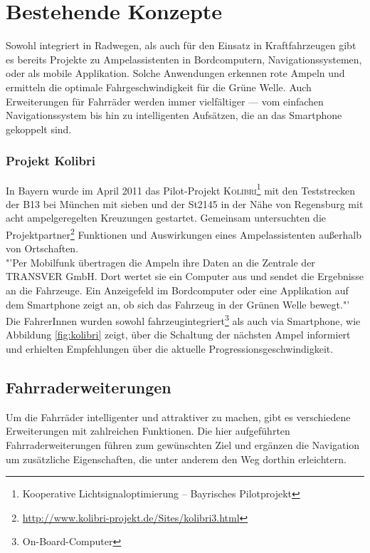 \chapter{\label{chap:state}Bestehende Konzepte}
Sowohl integriert in Radwegen, als auch für den Einsatz in Kraftfahrzeugen gibt es bereits Projekte zu Ampelassistenten in Bordcomputern, Navigationssystemen, oder als mobile Applikation. Solche Anwendungen erkennen rote Ampeln und ermitteln die optimale Fahrgeschwindigkeit für die Grüne Welle. Auch Erweiterungen für Fahrräder werden immer vielfältiger --- vom einfachen Navigationssystem bis hin zu intelligenten Aufsätzen, die an das \gls{Smartphone} gekoppelt sind.


\subsection*{\label{sec:kolibri}Projekt Kolibri}
In Bayern wurde im April 2011 das Pilot-Projekt \textsc{Kolibri}\footnote{ Kooperative Lichtsignaloptimierung -- Bayrisches Pilotprojekt} mit den Teststrecken der B13 bei München mit sieben und der St2145 in der Nähe von Regensburg mit acht ampelgeregelten Kreuzungen gestartet. Gemeinsam untersuchten die Projektpartner\footnote{ \url{http://www.kolibri-projekt.de/Sites/kolibri3.html}} Funktionen und Auswirkungen eines Ampelassistenten außerhalb von Ortschaften. \cite{kolibri}\\
"'Per Mobilfunk übertragen die Ampeln ihre Daten an die Zentrale der TRANSVER GmbH. Dort wertet sie ein Computer aus und sendet die Ergebnisse an die Fahrzeuge. Ein Anzeigefeld im Bordcomputer oder eine Applikation auf dem \gls{Smartphone} zeigt an, ob sich das Fahrzeug in der Grünen Welle bewegt."' \cite{kolibriTUM}\\
Die FahrerInnen wurden sowohl fahrzeugintegriert\footnote{ On-Board-Computer} als auch via \gls{Smartphone}, wie Abbildung \ref{fig:kolibri} zeigt, über die Schaltung der nächsten Ampel informiert und erhielten Empfehlungen über die aktuelle \gls{Progressionsgeschwindigkeit}.

%
%
\clearpage
\section{Fahrraderweiterungen}
Um die Fahrräder intelligenter und attraktiver zu machen, gibt es verschiedene Erweiterungen mit zahlreichen Funktionen. Die hier aufgeführten Fahrraderweiterungen führen zum gewünschten Ziel und ergänzen die Navigation um zusätzliche Eigenschaften, die unter anderem den Weg dorthin erleichtern.
